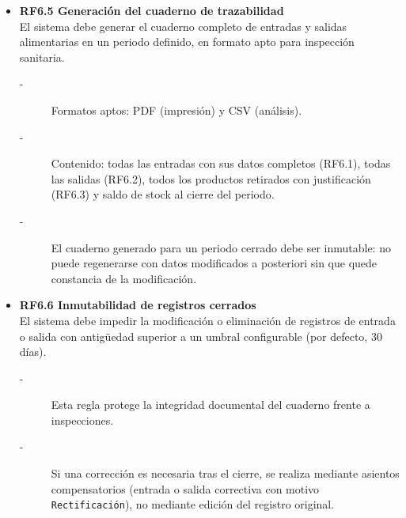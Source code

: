\begin{itemize}
    \item \textbf{RF6.5 Generación del cuaderno de trazabilidad} \\
    El sistema debe generar el cuaderno completo de entradas y
    salidas alimentarias en un periodo definido, en formato apto para
    inspección sanitaria.
    \begin{description}
        \item[-] Formatos aptos: PDF (impresión) y CSV (análisis).
        \item[-] Contenido: todas las entradas con sus datos completos (RF6.1), todas
        las salidas (RF6.2), todos los productos retirados con justificación
        (RF6.3) y saldo de stock al cierre del periodo.
        \item[-] El cuaderno generado para un periodo cerrado debe ser inmutable: no
        puede regenerarse con datos modificados a posteriori sin que quede
        constancia de la modificación.
    \end{description}

    \item \textbf{RF6.6 Inmutabilidad de registros cerrados} \\
    El sistema debe impedir la modificación o eliminación de registros de
    entrada o salida con antigüedad superior a un umbral configurable (por
    defecto, 30 días).
    \begin{description}
        \item[-] Esta regla protege la integridad documental del cuaderno frente a inspecciones.
        \item[-] Si una corrección es necesaria tras el cierre, se realiza mediante asientos
        compensatorios (entrada o salida correctiva con motivo \texttt{Rectificación}), no mediante edición del registro original.
    \end{description}
\end{itemize}

